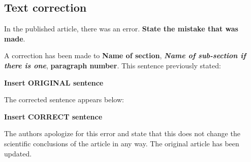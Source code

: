 \documentclass[utf8]{frontiers_correction}
\begin{document}
\subsection*{Text correction}
In the published article, there was an error. \textbf{State the mistake that was made}.\par
A correction has been made to \textbf{Name of section}, \textbf{\textit{Name of sub-section if there is one}}, \textbf{paragraph number}. This sentence previously stated:\par
\textbf{Insert ORIGINAL sentence}\par 
The corrected sentence appears below:\par
\textbf{Insert CORRECT sentence}\par 
The authors apologize for this error and state that this does not change the scientific conclusions of the article in any way. The original article has been updated.






\end{document}
